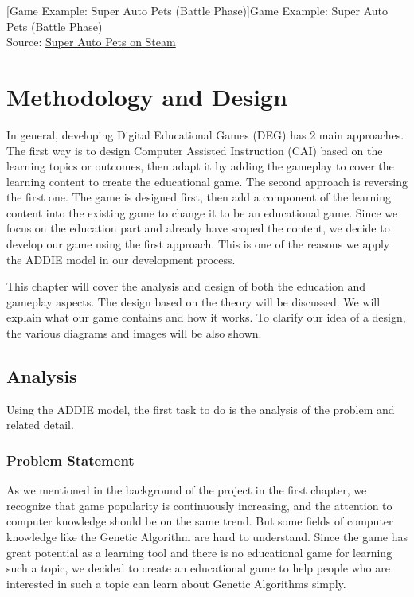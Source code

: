 \documentclass[12pt,oneside,openright,a4paper]{cpe-english-project}
\begin{document}
\begin{enumerate}
\begin{minipage}[c]{\textwidth}
	[Game Example: Super Auto Pets (Battle Phase)]{Game Example: Super Auto Pets (Battle Phase) 
		\\ Source: \href{https://store.steampowered.com/app/1714040/Super_Auto_Pets/}{Super Auto Pets on Steam}}
	\label{fig:related-work-sap2}
	\end{minipage}
\end{enumerate}



\chapter{Methodology and Design}
\hspace{2em}In general, developing Digital Educational Games (DEG) has 2 main approaches. The first way is to design Computer Assisted Instruction (CAI) based on the learning topics or outcomes, then adapt it by adding the gameplay to cover the learning content to create the educational game. The second approach is reversing the first one. The game is designed first, then add a component of the learning content into the existing game to change it to be an educational game. Since we focus on the education part and already have scoped the content, we decide to develop our game using the first approach. This is one of the reasons we apply the ADDIE model in our development process.

\hspace{2em}This chapter will cover the analysis and design of both the education and gameplay aspects. The design based on the theory will be discussed. We will explain what our game contains and how it works. To clarify our idea of a design, the various diagrams and images will be also shown.

\section{Analysis}
Using the ADDIE model, the first task to do is the analysis of the problem and related detail.

\subsection{Problem Statement}
As we mentioned in the background of the project in the first chapter, we recognize that game popularity is continuously increasing, and the attention to computer knowledge should be on the same trend. But some fields of computer knowledge like the Genetic Algorithm are hard to understand. Since the game has great potential as a learning tool and there is no educational game for learning such a topic, we decided to create an educational game to help people who are interested in such a topic can learn about Genetic Algorithms simply.
\end{document}
